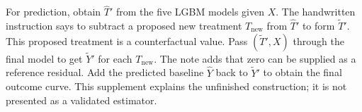 {For prediction, obtain $\hat T'$ from the five LGBM models given $X$. The handwritten instruction says to subtract a proposed new treatment $T_{\mathrm{new}}$ from $\hat T'$ to form $\widetilde T'$. This proposed treatment is a counterfactual value. Pass $(\widetilde T',X)$ through the final model to get $\widetilde Y'$ for each $T_{\mathrm{new}}$. The note adds that zero can be supplied as a reference residual. Add the predicted baseline $\hat Y$ back to $\widetilde Y'$ to obtain the final outcome curve. This supplement explains the unfinished construction; it is not presented as a validated estimator.

\begin{center}
\end{center}}
